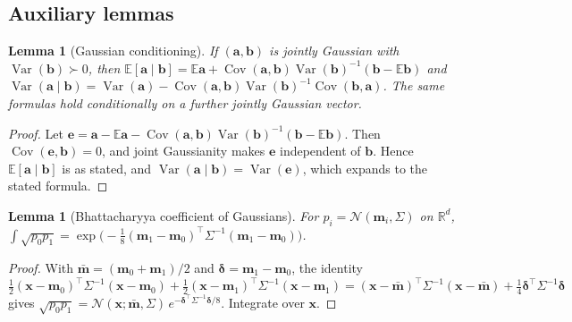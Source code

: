 \documentclass{article}
\theoremstyle{plain}
\newtheorem{lemma}[theorem]{Lemma}
\theoremstyle{definition}
\theoremstyle{remark}
\newcommand{\R}{\mathbb{R}}
\newcommand{\E}{\mathbb{E}}
\newcommand{\N}{\mathcal{N}}
\DeclareMathOperator{\Var}{Var}
\DeclareMathOperator{\Cov}{Cov}
\begin{document}
\subsection{Auxiliary lemmas}
\begin{lemma}[Gaussian conditioning]\label{lem:gauss}
If $(\bm a,\bm b)$ is jointly Gaussian with $\Var(\bm b)\succ0$, then $\E[\bm a\mid\bm b]=\E\bm a+\Cov(\bm a,\bm b)\Var(\bm b)^{-1}(\bm b-\E\bm b)$ and $\Var(\bm a\mid\bm b)=\Var(\bm a)-\Cov(\bm a,\bm b)\Var(\bm b)^{-1}\Cov(\bm b,\bm a)$. The same formulas hold conditionally on a further jointly Gaussian vector.
\end{lemma}
\begin{proof}
Let $\bm e=\bm a-\E\bm a-\Cov(\bm a,\bm b)\Var(\bm b)^{-1}(\bm b-\E\bm b)$. Then $\Cov(\bm e,\bm b)=0$, and joint Gaussianity makes $\bm e$ independent of $\bm b$. Hence $\E[\bm a\mid\bm b]$ is as stated, and $\Var(\bm a\mid\bm b)=\Var(\bm e)$, which expands to the stated formula.
\end{proof}
\begin{lemma}[Bhattacharyya coefficient of Gaussians]\label{lem:bc}
For $p_i=\N(\bm m_i,\Sigma)$ on $\R^d$, $\int\sqrt{p_0p_1}=\exp\big(-\tfrac18(\bm m_1-\bm m_0)^\top\Sigma^{-1}(\bm m_1-\bm m_0)\big)$.
\end{lemma}
\begin{proof}
With $\bar{\bm m}=(\bm m_0+\bm m_1)/2$ and $\bm\delta=\bm m_1-\bm m_0$, the identity $\tfrac12(\bm x-\bm m_0)^\top\Sigma^{-1}(\bm x-\bm m_0)+\tfrac12(\bm x-\bm m_1)^\top\Sigma^{-1}(\bm x-\bm m_1)=(\bm x-\bar{\bm m})^\top\Sigma^{-1}(\bm x-\bar{\bm m})+\tfrac14\bm\delta^\top\Sigma^{-1}\bm\delta$ gives $\sqrt{p_0p_1}=\N(\bm x;\bar{\bm m},\Sigma)\,e^{-\bm\delta^\top\Sigma^{-1}\bm\delta/8}$. Integrate over $\bm x$.
\end{proof}
\end{document}
